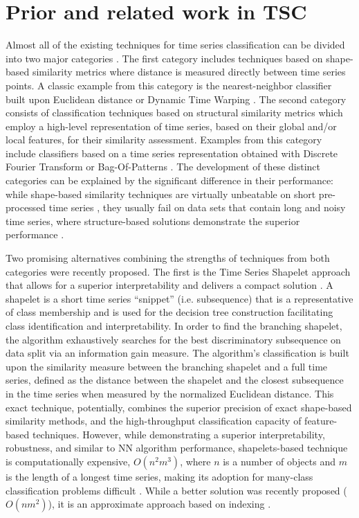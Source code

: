 \section{Prior and related work in TSC} \label{sax_vsm_prior}
Almost all of the existing techniques for time series classification can be divided into two major categories \cite{citeulike:11796594}. 
The first category includes techniques based on shape-based similarity metrics where distance is measured directly between 
time series points. A classic example from this category is the nearest-neighbor classifier built upon Euclidean distance 
\cite{citeulike:4214336} or Dynamic Time Warping \cite{senin2008dynamic}. 
The second category consists of classification techniques based on structural similarity metrics which employ a high-level 
representation of time series, based on their global and/or local features, for their similarity assessment. 
Examples from this category include classifiers based on a time series representation obtained with 
Discrete Fourier Transform \cite{citeulike:5094223} or Bag-Of-Patterns \cite{citeulike:10525778}. 
The development of these distinct categories can be explained by the significant difference in their performance: 
while shape-based similarity techniques are virtually unbeatable on short pre-processed time series \cite{citeulike:532340}, 
they usually fail on data sets that contain long and noisy time series, 
where structure-based solutions demonstrate the superior performance \cite{citeulike:10525778}. 

Two promising alternatives combining the strengths of techniques from both categories were recently proposed.
The first is the Time Series Shapelet approach that allows for a superior interpretability and delivers a compact 
solution \cite{citeulike:7344347}. 
A shapelet is a short time series ``snippet'' (i.e. subsequence) that is a representative of class membership and is used for 
the decision tree construction facilitating class identification and interpretability.
In order to find the branching shapelet, the algorithm exhaustively searches for the best discriminatory subsequence on data split 
via an information gain measure. The algorithm's classification is built upon the similarity measure between the branching 
shapelet and a full time series, defined as the distance between the shapelet and the closest subsequence in the time series 
when measured by the normalized Euclidean distance. This exact technique, potentially, combines the superior precision of 
exact shape-based similarity methods, and the high-throughput classification capacity of feature-based techniques. 
However, while demonstrating a superior interpretability, robustness, and similar to NN algorithm performance, shapelets-based 
technique is computationally expensive, $O(n^{2}m^{3})$, where $n$ is a number of objects and $m$ is the length of a longest 
time series, making its adoption for many-class classification problems difficult \cite{citeulike:11345338}. 
While a better solution was recently proposed ($O(nm^{2})$), it is an approximate approach based on indexing \cite{citeulike:12563493}.

